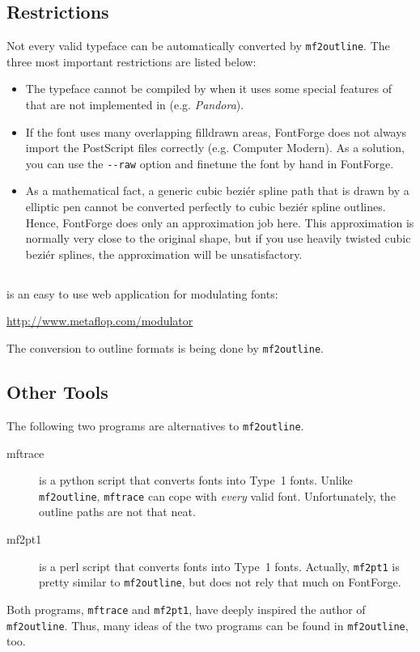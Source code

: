 \documentclass{scrartcl}
\begin{document}
\subsection{Restrictions}
%
Not every valid \MF{} typeface can be automatically converted by \verb|mf2outline|. The three most important restrictions are listed below:
\begin{itemize}
	\item The \MF{} typeface cannot be compiled by \MP{} when it uses some special features of \MF{} that are not implemented in \MP{} (e.g. \emph{Pandora}).
	\item If the font uses many overlapping filldrawn areas, FontForge does not always import the PostScript files correctly (e.g. Computer Modern). As a solution, you can use the \verb|--raw| option and finetune the font by hand in FontForge.
	\item As a mathematical fact, a generic cubic beziér spline path that is drawn by a elliptic pen cannot be converted perfectly to cubic beziér spline outlines. Hence, FontForge does only an approximation job here. This approximation is normally very close to the original shape, but if you use heavily twisted cubic beziér splines, the approximation will be unsatisfactory.
\end{itemize}
%
\subsection{}
%
 is an easy to use web application for modulating \MF{} fonts:
\begin{center}
	\url{http://www.metaflop.com/modulator}
\end{center}
The conversion to outline formats is being done by \verb|mf2outline|. 
%
\subsection{Other Tools}
%
The following two programs are alternatives to \verb|mf2outline|.
%
\begin{description}
	\item[mftrace] is a python script that converts \MF{} fonts into Type~1 fonts. Unlike \verb|mf2outline|, \verb|mftrace| can cope with \emph{every} valid \MF{} font. Unfortunately, the outline paths are not that neat.
	\item[mf2pt1] is a perl script that converts \MF{} fonts into Type~1 fonts. Actually, \verb|mf2pt1| is pretty similar to \verb|mf2outline|, but does not rely that much on FontForge.
\end{description}
%
Both programs, \verb|mftrace| and \verb|mf2pt1|, have deeply inspired the author of \verb|mf2outline|. Thus, many ideas of the two programs can be found in \verb|mf2outline|, too.
%
\end{document}

